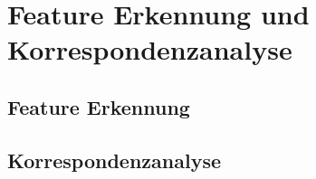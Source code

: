 
\section{Feature Erkennung und Korrespondenzanalyse}
\label{kap:FeatureErkennungUndKorrespondenzanalyse}

\subsection{Feature Erkennung}
\label{kap:FeatureErkennung}

\subsection{Korrespondenzanalyse}
\label{kap:Korrespondenzanalyse}


\clearpage
